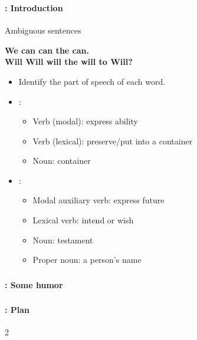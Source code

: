 \documentclass[xcolor=table]{beamer}
\subtitle[05- POS tagging]{Chapter 05\\Part-of-speech tagging}
\begin{document}
\begin{frame}
	\frametitle{\inserttitle}
	\framesubtitle{\insertshortsubtitle: Introduction}
	
	\begin{exampleblock}{Ambiguous sentences}
		\begin{center}
			\Large\bfseries
			We can can the can.\\[0.3em]
			Will Will will the will to Will?
		\end{center}
	\end{exampleblock}
	
	\begin{itemize}
		\item Identify the part of speech of each word.
		\item {}:
		\begin{itemize}
			\item Verb (modal): express ability
			\item Verb (lexical): preserve/put into a container
			\item Noun: container
		\end{itemize}
		
		\item {}:
		\begin{itemize}
			\item Modal auxiliary verb: express future
			\item Lexical verb: intend or wish
			\item Noun: testament
			\item Proper noun: a person's name
		\end{itemize}
	\end{itemize}
	
\end{frame}


\begin{frame}
	\frametitle{\inserttitle}
	\framesubtitle{\insertshortsubtitle: Some humor}

	\begin{center}
	\end{center}

\end{frame}

\begin{frame}
	\frametitle{\inserttitle}
	\framesubtitle{\insertshortsubtitle: Plan}

	\begin{multicols}{2}
	\tableofcontents
	\end{multicols}

\end{frame}
\end{document}
